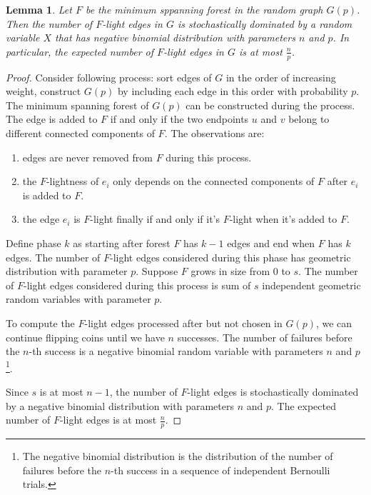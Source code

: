 \documentclass[11pt]{article}
\theoremstyle{plain}
\newtheorem{lemma}{Lemma}[section]
\begin{document}
\begin{lemma}
    \label{lemma:randomizedmst}
    Let $F$ be the minimum sppanning forest in the random graph $G(p)$. Then the number of $F$-light edges in $G$ is stochastically dominated by a random variable $X$ that has negative binomial distribution with parameters $n$ and $p$. In particular, the expected number of $F$-light edges in $G$ is at most $\frac{n}{p}$.
\end{lemma}
\begin{proof}
    Consider following process: sort edges of $G$ in the order of increasing weight, construct $G(p)$ by including each edge in this order with probability $p$. The minimum spanning forest of $G(p)$ can be constructed during the process. The edge is added to $F$ if and only if the two endpoints $u$ and $v$ belong to different connected components of $F$. The observations are:
    \begin{enumerate}
        \item edges are never removed from $F$ during this process.
        \item the $F$-lightness of $e_i$ only depends on the connected components of $F$ after $e_i$ is added to $F$.
        \item the edge $e_i$ is $F$-light finally if and only if it's $F$-light when it's added to $F$.
    \end{enumerate}
    Define phase $k$ as starting after forest $F$ has $k-1$ edges and end when $F$ has $k$ edges. The number of $F$-light edges considered during this phase has geometric distribution with parameter $p$. Suppose $F$ grows in size from 0 to $s$. The number of $F$-light edges considered during this process is sum of $s$ independent geometric random variables with parameter $p$.

    To compute the $F$-light edges processed after but not chosen in $G(p)$, we can continue flipping coins until we have $n$ successes. The number of failures before the $n$-th success is a negative binomial random variable with parameters $n$ and $p$\footnote{The negative binomial distribution is the distribution of the number of failures before the $n$-th success in a sequence of independent Bernoulli trials.}. 

    Since $s$ is at most $n-1$, the number of $F$-light edges is stochastically dominated by a negative binomial distribution with parameters $n$ and $p$. The expected number of $F$-light edges is at most $\frac{n}{p}$.
\end{proof}
\end{document}
